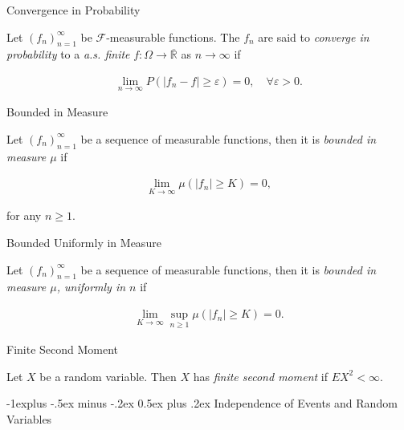 \documentclass[10pt,landscape]{article}
\makeatletter
\renewcommand{\geq}{\geqslant}
\newcommand{\CalF}{\mathcal{F}}
\renewcommand{\subsection}{\@startsection{subsection}{2}{0mm}%
                                {-1explus -.5ex minus -.2ex}%
                                {0.5ex plus .2ex}%
                                {\normalfont\normalsize\bfseries}}
\makeatother
\begin{document}
\begin{multicols}{3}
\begin{definition}{5.2}{Convergence in Probability}

    Let $(f_n)_{n=1}^{\infty}$ be $\CalF$-measurable functions. The $f_n$ are said to \emph{converge in probability} to a \emph{a.s. finite} $f: \Omega \to \overline{\mathbb{R}}$ as $n \to \infty$ if

        \begin{align*}
            \lim_{n \to \infty} P(|f_n - f| \geq \varepsilon) = 0, \quad \forall \varepsilon > 0.
        \end{align*}

\end{definition}

\begin{definition}{}{Bounded in Measure}

    Let $(f_n)_{n=1}^{\infty}$ be a sequence of measurable functions, then it is \emph{bounded in measure $\mu$} if

        \begin{align*}
            \lim_{K \to \infty} \mu(|f_n| \geq K) = 0,
        \end{align*}

    for any $n \geq 1$.

\end{definition}

\begin{definition}{}{Bounded Uniformly in Measure}

    Let $(f_n)_{n=1}^{\infty}$ be a sequence of measurable functions, then it is \emph{bounded in measure $\mu$, uniformly in $n$} if

        \begin{align*}
            \lim_{K \to \infty} \sup_{n \geq 1} \mu(|f_n| \geq K) = 0.
        \end{align*}

\end{definition}

\begin{definition}{}{Finite Second Moment}

    Let $X$ be a random variable. Then $X$ has \emph{finite second moment} if $EX^2 < \infty$.

\end{definition}

\subsection{Independence of Events and Random Variables}


\end{multicols}
\end{document}
